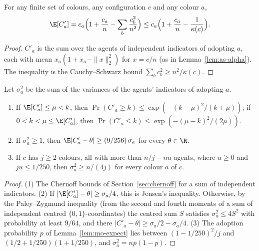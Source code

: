 \begin{lemma}[Lemma~2.1]\label{lem:mo-expect}
\leanok
{}
For any finite set of colours, any configuration $c$ and any colour $a$,
\[
  \E[C'_a]=c_a\Bigl(1+\frac{c_a}{n}-\sum_b\frac{c_b^2}{n^2}\Bigr)
  \le c_a\Bigl(1+\frac{c_a}{n}-\frac{1}{\kappa(c)}\Bigr).
\]
\end{lemma}
\begin{proof}\leanok
$C'_a$ is the sum over the agents of independent indicators of adopting $a$, each with mean
$x_a(1+x_a-\|x\|_2^2)$ for $x=c/n$ (as in Lemma~\ref{lem:as-alpha}). The inequality is the
Cauchy--Schwarz bound $\sum_b c_b^2\ge n^2/\kappa(c)$.
\end{proof}

\begin{lemma}\label{lem:mo-tails}
\leanok
{}
Let $\sigma_a^2$ be the sum of the variances of the agents' indicators of adopting $a$.
\begin{enumerate}
  \item If $\E[C'_a]\le\mu<k$, then $\Pr(C'_a\ge k)\le\exp(-(k-\mu)^2/(k+\mu))$; if
    $0<k<\mu\le\E[C'_a]$, then $\Pr(C'_a\le k)\le\exp(-(\mu-k)^2/(2\mu))$.
  \item If $\sigma_a^2\ge1$, then $\E|C'_a-\theta|\ge(9/256)\,\sigma_a$ for every $\theta\in\R$.
  \item If $c$ has $j\ge2$ colours, all with more than $n/j-nu$ agents, where $u\ge0$ and
    $ju\le1/250$, then $\sigma_a^2\ge n/(4j)$ for every colour $a$ of $c$.
\end{enumerate}
\end{lemma}
\begin{proof}\leanok
(1) The Chernoff bounds of Section~\ref{sec:chernoff} for a sum of independent indicators.
(2) If $|\E[C'_a]-\theta|\ge\sigma_a/4$, this is Jensen's inequality. Otherwise, by the
Paley--Zygmund inequality (from the second and fourth moments of a sum of independent centred
$\{0,1\}$-coordinates) the centred sum $S$ satisfies $\sigma_a^2\le4S^2$ with probability at least
$9/64$, and there $|C'_a-\theta|\ge\sigma_a/2-\sigma_a/4$. (3) The adoption probability $p$ of
Lemma~\ref{lem:mo-expect} lies between $(1-1/250)^2/j$ and $(1/2+1/250)(1+1/250)$, and
$\sigma_a^2=np(1-p)$.
\end{proof}

